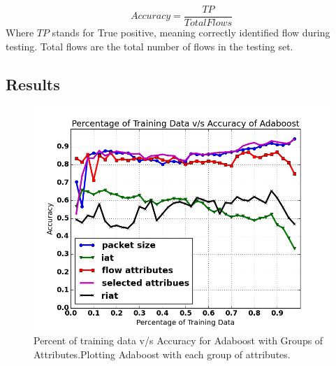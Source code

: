 \documentclass[conference]{IEEEtran}
\begin{document}
\begin{equation}
	Accuracy = \frac{TP}{Total Flows}
\end{equation}
 Where $TP$ stands for True positive, meaning correctly identified flow during testing. Total flows are the total number of flows in the testing set.

\subsection{Results}
\begin{figure}[!t]
	\centering
	\includegraphics[width=1\columnwidth]{adaboost_all_attr_plot.png}
	\caption{Percent of training data v/s Accuracy for Adaboost with Groups of Attributes.Plotting Adaboost with each group of attributes.}
	\label{fig:adaboost_attributes}
\end{figure}
\end{document}
